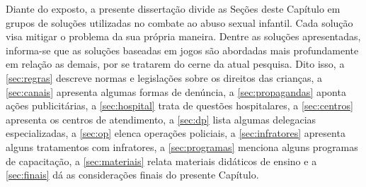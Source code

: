 Diante do exposto, a presente dissertação divide as Seções deste Capítulo em grupos de soluções utilizadas no combate ao abuso sexual infantil. Cada solução visa mitigar o problema da sua própria maneira. Dentre as soluções apresentadas, informa-se que as soluções baseadas em jogos são abordadas mais profundamente em relação as demais, por se tratarem do cerne da atual pesquisa. Dito isso, a \autoref{sec:regras} descreve normas e legislações sobre os direitos das crianças, a \autoref{sec:canais} apresenta algumas formas de denúncia, a \autoref{sec:propagandas} aponta ações publicitárias, a \autoref{sec:hospital} trata de questões hospitalares, a \autoref{sec:centros} apresenta os centros de atendimento, a \autoref{sec:dp} lista algumas delegacias especializadas, a \autoref{sec:op} elenca operações policiais, a \autoref{sec:infratores} apresenta alguns tratamentos com infratores, a \autoref{sec:programas} menciona alguns programas de capacitação, a \autoref{sec:materiais} relata materiais didáticos de ensino e a \autoref{sec:finais} dá as considerações finais do presente Capítulo. 

















